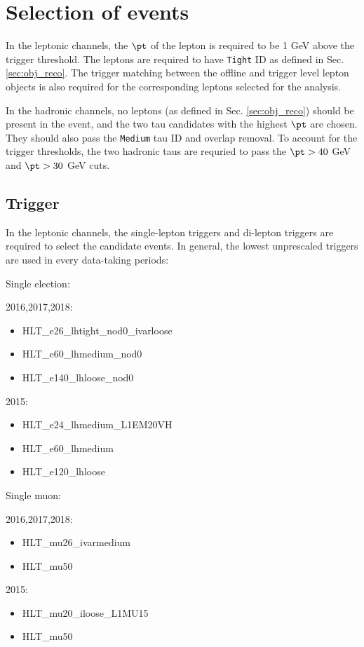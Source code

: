\section{Selection of events}
\label{sec:selection}

In the leptonic channels, the $\pt$ of the lepton is required to be 1 GeV above the trigger threshold. The leptons are required to have \texttt{Tight} ID as defined in Sec. \ref{sec:obj_reco}. The trigger matching between the offline and trigger level lepton objects is also required for the corresponding leptons selected for the analysis.

In the hadronic channels, no leptons (as defined in Sec. \ref{sec:obj_reco}) should be present in the event, and the two tau candidates with the highest $\pt$ are chosen. They should also pass the \texttt{Medium} tau ID and overlap removal. To account for the trigger thresholds, the two hadronic taus are requried to pass the $\pt>40$ GeV and $\pt>30$ GeV cuts.

\subsection{Trigger}
\label{sec:trigger}

In the leptonic channels, the single-lepton triggers and di-lepton triggers are required to select the candidate events. In general, the lowest unprescaled triggers are used in every data-taking periods:

Single election:

2016,2017,2018:
\begin{itemize}
	\item HLT\_e26\_lhtight\_nod0\_ivarloose
	\item HLT\_e60\_lhmedium\_nod0
	\item HLT\_e140\_lhloose\_nod0
\end{itemize}
2015:
\begin{itemize}
	\item HLT\_e24\_lhmedium\_L1EM20VH
	\item HLT\_e60\_lhmedium
	\item HLT\_e120\_lhloose
\end{itemize}

Single muon:

2016,2017,2018:
\begin{itemize}
	\item HLT\_mu26\_ivarmedium
	\item HLT\_mu50
\end{itemize}
2015:
\begin{itemize}
	\item HLT\_mu20\_iloose\_L1MU15
	\item HLT\_mu50
\end{itemize}

